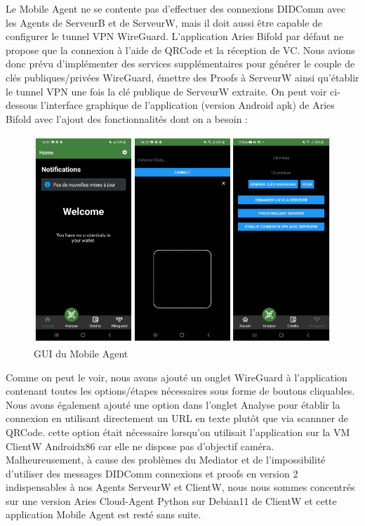 \documentclass[12pt, openany]{report}
\begin{document}
\begin{flushleft}
\vspace{2mm}
Le Mobile Agent ne se contente pas d'effectuer des connexions DIDComm avec les Agents de ServeurB et de ServeurW, mais il doit aussi être capable de configurer le tunnel VPN WireGuard. L'application Aries Bifold par défaut ne propose que la connexion à l'aide de QRCode et la réception de VC. Nous avions donc prévu d'implémenter des services supplémentaires pour générer le couple de clés publiques/privées WireGuard, émettre des Proofs à ServeurW ainsi qu'établir le tunnel VPN une fois la clé publique de ServeurW extraite. On peut voir ci-dessous l'interface graphique de l'application (version Android apk) de Aries Bifold avec l'ajout des fonctionnalités dont on a besoin :\\
\begin{figure}[H]
\includegraphics[width=\textwidth]{mobile-agent.png}
\centering
\caption{GUI du Mobile Agent}
\end{figure}
Comme on peut le voir, nous avons ajouté un onglet WireGuard à l'application contenant toutes les options/étapes nécessaires sous forme de boutons cliquables. Nous avons également ajouté une option dans l'onglet Analyse pour établir la connexion en utilisant directement un URL en texte plutôt que via scannner de QRCode. cette option était nécessaire lorsqu'on utilisait l'application sur la VM ClientW Androidx86 car elle ne dispose pas d'objectif caméra.\\
\vspace{2mm}
Malheureusement, à cause des problèmes du Mediator et de l'impossibilité d'utiliser des messages DIDComm connexions et proofs en version 2 indispensables à nos Agents ServeurW et ClientW, nous nous sommes concentrés sur une version Aries Cloud-Agent Python sur Debian11 de ClientW et cette application Mobile Agent est resté sans suite.
\end{flushleft}
\end{document}
